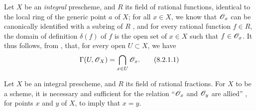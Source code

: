 \begin{env}[8.2.1]
\label{I.8.2.1}
Let $X$ be an \emph{integral} prescheme, and $R$ its field of rational functions, identical to the local ring of the generic point $a$ of $X$;
for all $x\in X$, we know that $\mathscr{O}_x$ can be canonically identified with a subring of $R$ , and for every rational function $f\in R$, the domain of definition $\delta(f)$ of $f$ is the open set of $x\in X$ such that
$f\in\mathscr{O}_x$.
It thus follows, from , that, for every open $U\subset X$, we have
\[
\label{I.8.2.1.1}
  \Gamma(U,\mathscr{O}_X)=\bigcap_{x\in U}\mathscr{O}_x.
  \tag{8.2.1.1}
\]
\end{env}

\begin{proposition}[8.2.2]
\label{I.8.2.2}
Let $X$ be an integral prescheme, and $R$ its field of rational fractions. For $X$ to be a scheme, it is necessary and sufficient for the relation ``$\mathscr{O}_x$ and $\mathscr{O}_y$ are allied'' , for points $x$ and $y$ of $X$, to imply that $x=y$.
\end{proposition}

